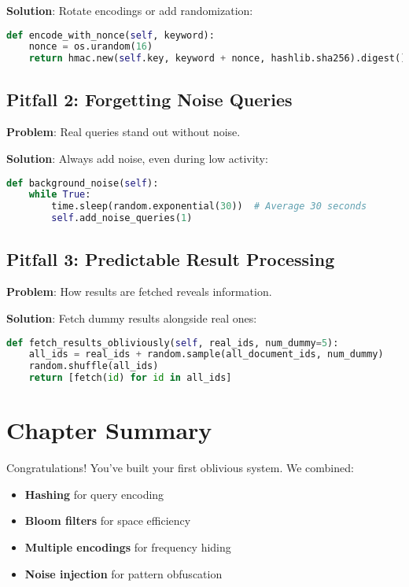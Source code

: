 \textbf{Solution}: Rotate encodings or add randomization:
\begin{lstlisting}[language=Python]
def encode_with_nonce(self, keyword):
    nonce = os.urandom(16)
    return hmac.new(self.key, keyword + nonce, hashlib.sha256).digest()
\end{lstlisting}

\subsection{Pitfall 2: Forgetting Noise Queries}

\textbf{Problem}: Real queries stand out without noise.

\textbf{Solution}: Always add noise, even during low activity:
\begin{lstlisting}[language=Python]
def background_noise(self):
    while True:
        time.sleep(random.exponential(30))  # Average 30 seconds
        self.add_noise_queries(1)
\end{lstlisting}

\subsection{Pitfall 3: Predictable Result Processing}

\textbf{Problem}: How results are fetched reveals information.

\textbf{Solution}: Fetch dummy results alongside real ones:
\begin{lstlisting}[language=Python]
def fetch_results_obliviously(self, real_ids, num_dummy=5):
    all_ids = real_ids + random.sample(all_document_ids, num_dummy)
    random.shuffle(all_ids)
    return [fetch(id) for id in all_ids]
\end{lstlisting}

\section{Chapter Summary}

Congratulations! You've built your first oblivious system. We combined:
\begin{itemize}
    \item \textbf{Hashing} for query encoding
    \item \textbf{Bloom filters} for space efficiency
    \item \textbf{Multiple encodings} for frequency hiding
    \item \textbf{Noise injection} for pattern obfuscation
\end{itemize}

